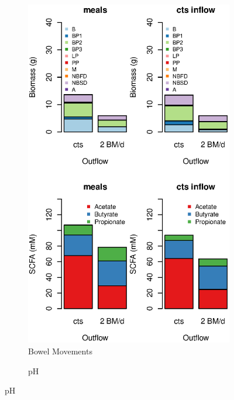 \documentclass[a4paper]{article}
\begin{document}
 \begin{figure}
    \centering
    \begin{subfigure}[t]{0.32\textwidth}%
      \caption{Bowel Movements}%
      \includegraphics[scale=0.35]{images/BMpdbarSmall.eps}
    \end{subfigure}
    \begin{subfigure}[t]{0.32\textwidth}
      \caption{pH}

\end{subfigure}
\end{figure}
\end{document}

